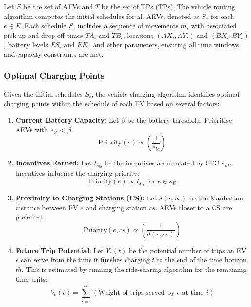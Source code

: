 Let \( E \) be the set of AEVs and \( T \) be the set of TPs (TPs). The vehicle routing algorithm computes the initial schedules for all AEVs, denoted as \( S_e \) for each \( e \in E \). Each schedule \( S_e \) includes a sequence of movements \( m_i \) with associated pick-up and drop-off times \( TA_i \) and \( TB_i \), locations \( (AX_i, AY_i) \) and \( (BX_i, BY_i) \), battery levels \( ES_i \) and \( EE_i \), and other parameters, ensuring all time windows and capacity constraints are met.

\subsubsection{Optimal Charging Points}

Given the initial schedules \( S_e \), the vehicle charging algorithm identifies optimal charging points within the schedule of each EV based on several factors:

\begin{enumerate}
    \item \textbf{Current Battery Capacity:} Let \( \beta \) be the battery threshold. Prioritise AEVs with \( e_{bc} < \beta \).
    \[
    \text{Priority}(e) \propto \left( \frac{1}{e_{bc}} \right)
    \]
    
    \item \textbf{Incentives Earned:} Let \( I_{s_{id}} \) be the incentives accumulated by SEC \( s_{id} \). Incentives influence the charging priority:
    \[
    \text{Priority}(e) \propto I_{s_{id}} \text{ for } e \in s_E
    \]
    
    \item \textbf{Proximity to Charging Stations (CS):} Let \( d(e, cs) \) be the Manhattan distance between EV \( e \) and charging station \( cs \). AEVs closer to a CS are preferred:
    \[
    \text{Priority}(e, cs) \propto \left( \frac{1}{d(e, cs)} \right)
    \]
    
    \item \textbf{Future Trip Potential:} Let \( V_e(t) \) be the potential number of trips an EV \( e \) can serve from the time it finishes charging \( t \) to the end of the time horizon \( th \). This is estimated by running the ride-sharing algorithm for the remaining time units:
    \[
    V_e(t) = \sum_{i=t}^{th} \left( \text{Weight of trips served by } e \text{ at time } i \right)
    \]
\end{enumerate}


